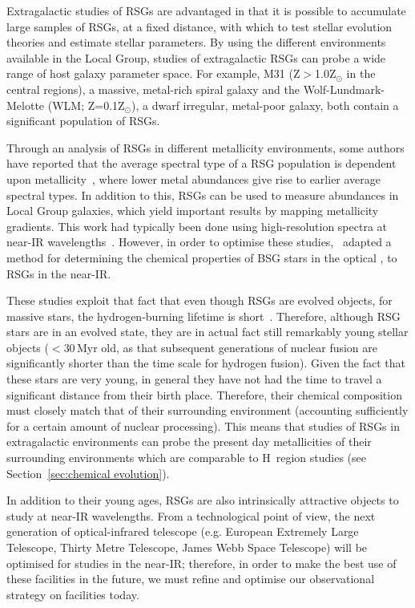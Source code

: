 {Extragalactic studies of RSGs are advantaged in that it is possible to accumulate large samples of RSGs, at a fixed distance, with which to test stellar evolution theories and estimate stellar parameters.
By using the different environments available in the Local Group, studies of extragalactic RSGs can probe a wide range of host galaxy parameter space.
For example, M31 (Z$>$1.0Z$_{\odot}$ in the central regions), a massive, metal-rich spiral galaxy and the Wolf-Lundmark-Melotte (WLM; Z=0.1Z$_{\odot}$), a dwarf irregular, metal-poor galaxy, both contain a significant population of RSGs.

Through an analysis of RSGs in different metallicity environments, some authors have reported that the average spectral type of a RSG population is dependent upon metallicity~\citep{Elias85, MasseyOlsen03, 2012AJ....144....2L}, where lower metal abundances give rise to earlier average spectral types.
In addition to this, RSGs can be used to measure abundances in Local Group galaxies, which yield important results by mapping metallicity gradients.
This work had typically been done using high-resolution spectra at near-IR wavelengths~\citep{Cunha07, Davies09a,Davies09b}.
However, in order to optimise these studies,~\cite{2010MNRAS.407.1203D} adapted a method for determining the chemical properties of BSG stars in the optical
\citep{2008ApJ...681..269K,2010AN....331..459K}, to RSGs in the near-IR.

These studies exploit that fact that even though RSGs are evolved objects, for massive stars, the hydrogen-burning lifetime is short~\citep[just over 25\,Myr for a 8\,M$_{\odot}$ star and consequently shorter for higher mass stars][]{2012A&A...537A.146E}.
Therefore, although RSG stars are in an evolved state, they are in actual fact still remarkably young stellar objects ($<$30\,Myr old, as that subsequent generations of nuclear fusion are significantly shorter than the time scale for hydrogen fusion).
Given the fact that these stars are very young, in general they have not had the time to travel a significant distance from their birth place.
Therefore, their chemical composition must closely match that of their surrounding environment (accounting sufficiently for a certain amount of nuclear processing).
This means that studies of RSGs in extragalactic environments can probe the present day metallicities of their surrounding environments which are comparable to H\,\2 region studies (see Section~\ref{sec:chemical evolution}).

In addition to their young ages, RSGs are also intrinsically attractive objects to study at near-IR wavelengths.
From a technological point of view, the next generation of optical-infrared telescope (e.g. European Extremely Large Telescope, Thirty Metre Telescope, James Webb Space Telescope) will be optimised for studies in the near-IR; therefore, in order to make the best use of these facilities in the future, we must refine and optimise our observational strategy on facilities today.

}
